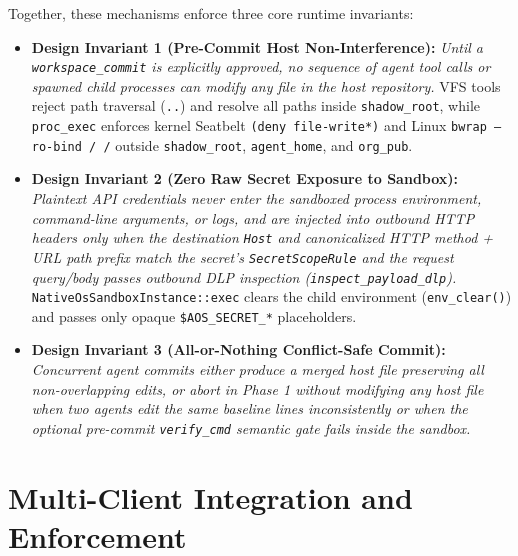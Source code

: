 \documentclass[acmsmall,screen,review]{acmart}
\begin{document}
Together, these mechanisms enforce three core runtime invariants:
\begin{itemize}
    \item \textbf{Design Invariant 1 (Pre-Commit Host Non-Interference):} \emph{Until a \texttt{workspace\_commit} is explicitly approved, no sequence of agent tool calls or spawned child processes can modify any file in the host repository.} VFS tools reject path traversal (\texttt{..}) and resolve all paths inside \texttt{shadow\_root}, while \texttt{proc\_exec} enforces kernel Seatbelt \texttt{(deny file-write*)} and Linux \texttt{bwrap --ro-bind / /} outside \texttt{shadow\_root}, \texttt{agent\_home}, and \texttt{org\_pub}.
    \item \textbf{Design Invariant 2 (Zero Raw Secret Exposure to Sandbox):} \emph{Plaintext API credentials never enter the sandboxed process environment, command-line arguments, or logs, and are injected into outbound HTTP headers only when the destination \texttt{Host} and canonicalized HTTP method + URL path prefix match the secret's \texttt{SecretScopeRule} and the request query/body passes outbound DLP inspection (\texttt{inspect\_payload\_dlp}).} \texttt{NativeOsSandboxInstance::exec} clears the child environment (\texttt{env\_clear()}) and passes only opaque \texttt{\$AOS\_SECRET\_*} placeholders.
    \item \textbf{Design Invariant 3 (All-or-Nothing Conflict-Safe Commit):} \emph{Concurrent agent commits either produce a merged host file preserving all non-overlapping edits, or abort in Phase 1 without modifying any host file when two agents edit the same baseline lines inconsistently or when the optional pre-commit \texttt{verify\_cmd} semantic gate fails inside the sandbox.}
\end{itemize}

\section{Multi-Client Integration and Enforcement}
\label{sec:integration}
\end{document}
